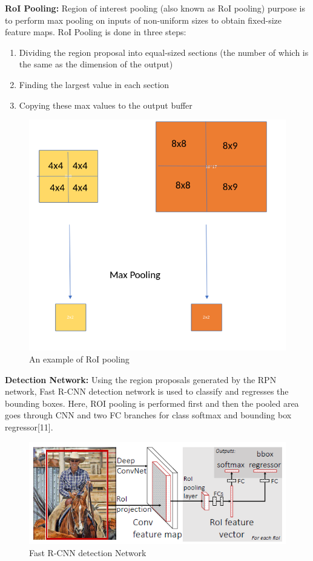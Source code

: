 \documentclass[12pt]{article}
\begin{document}
\textbf{RoI Pooling: } Region of interest pooling (also known as RoI pooling) purpose is to perform max pooling on inputs of non-uniform sizes to obtain fixed-size feature maps. RoI Pooling is done in three steps:
\begin{enumerate}
	\item Dividing the region proposal into equal-sized sections (the number of which is the same as the dimension of the output)
	
	\item Finding the largest value in each section
	
	\item Copying these max values to the output buffer

\end{enumerate}

\begin{figure}[H]
\centering
  \includegraphics[width=0.4\linewidth]{./Images/ROIPool.png}
  \caption{An example of RoI pooling}
  \label{fig:ROIPool}
\end{figure}

\textbf{Detection Network: } Using the region proposals generated by the RPN network, Fast R-CNN detection network is used to classify and regresses the bounding boxes. Here, ROI pooling is performed first and then the pooled area goes through CNN and two FC branches for class softmax and bounding box regressor[11].
\begin{figure}[H]
\centering
  \includegraphics[width=0.5\linewidth]{./Images/DetectionNW.png}
  \caption{Fast R-CNN detection Network}
  \label{fig:detection_model}
\end{figure}
\end{document}
